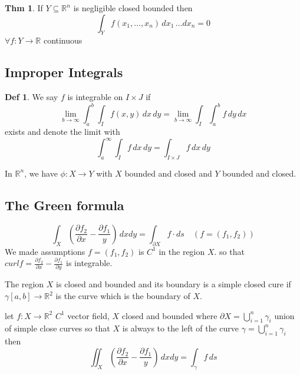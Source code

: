 \documentclass[a4paper, 10pt]{article}
\theoremstyle{definition}
\newtheorem*{theorem}{Thm}
\newtheorem*{definition}{Def}
\newcommand{\R}{\mathbb{R}}
\begin{document}
\begin{theorem}
    If \(Y \subseteq \R^n\) is negligible closed bounded then
    \[\int_Y f(x_1, \ldots, x_n) \, dx_1 \, \ldots dx_n = 0\]
    \(\forall f: Y \to \R\) continuous
\end{theorem}

\subsection*{Improper Integrals}
\begin{definition}
    We say \(f\) is integrable on \(I \times J\) if
    \[\lim_{b \to \infty} \int_a^b \int_I f(x, y) \,dx \,dy = \lim_{b \to \infty} \int_I \int_a^b f \, dy \, dx\]
    exists and denote the limit with
    \[\int_a^\infty \int_I f \,dx \,dy = \int_{I \times J} f \,dx \,dy\]
\end{definition}

\begin{ntheorem*}
    In \(\R^n\), we have \(\phi: X \to Y\) with \(X\) bounded and closed and \(Y\) bounded and closed.
\end{ntheorem*}

\subsection*{The Green formula}

\begin{ntheorem*}
    \[\int_X (\frac{\partial f_2}{\partial x} - \frac{\partial f_1}{y}) \, dx dy = \int_{\partial X} f \cdot ds \quad (f = (f_1, f_2))\]
    We made assumptions \(f = (f_1, f_2)\) is \(C^1\) in the region \(X\). so that \(curl f = \frac{\partial f_2}{\partial x } - \frac{\partial f_1}{\partial y}\) is integrable.

    \noindent The region \(X\) is closed and bounded and its boundary is a simple closed cure if \(\gamma[a, b] \to \R^2\) is the curve which is the boundary of \(X\).
\end{ntheorem*}

\begin{ntheorem*}
    let \(f: X \to \R^2\) \(C^1\) vector field, \(X\) closed and bounded where \(\partial X = \bigcup_{i = 1}^n \gamma_i\) union of simple close curves so that \(X\)  is always to the left of the curve \(\gamma = \bigcup_{i = 1}^n \gamma_i\) then
    \[\iint_{X} \left(\frac{\partial f_2}{\partial x} - \frac{\partial f_1}{y}\right) \, dx dy = \int_\gamma f \, ds\]
\end{ntheorem*}
\end{document}
